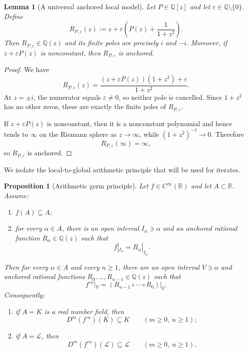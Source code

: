 \documentclass[11pt,reqno]{amsart}
\numberwithin{equation}{section}
\newtheorem{proposition}[theorem]{Proposition}
\newtheorem{lemma}[theorem]{Lemma}
\theoremstyle{definition}
\theoremstyle{remark}
\newcommand{\R}{\mathbb R}
\newcommand{\Q}{\mathbb Q}
\newcommand{\Lio}{\mathscr L}
\begin{document}
\begin{lemma}[A universal anchored local model]\label{lem:model}
Let $P\in\Q[z]$ and let $\varepsilon\in\Q\setminus\{0\}$. Define
\[
R_{P,\varepsilon}(z)
:=z+\varepsilon\left(P(z)+\frac1{1+z^2}\right).
\]
Then $R_{P,\varepsilon}\in\Q(z)$ and its finite poles are precisely $i$ and $-i$.
Moreover, if $z+\varepsilon P(z)$ is nonconstant, then $R_{P,\varepsilon}$ is anchored.
\end{lemma}

\begin{proof}
We have
\[
R_{P,\varepsilon}(z)
=
\frac{(z+\varepsilon P(z))(1+z^2)+\varepsilon}{1+z^2}.
\]
At $z=\pm i$, the numerator equals $\varepsilon\neq0$, so neither pole is
cancelled. Since $1+z^2$ has no other zeros, these are exactly the finite
poles of $R_{P,\varepsilon}$.

If $z+\varepsilon P(z)$ is nonconstant, then it is a nonconstant polynomial
and hence tends to $\infty$ on the Riemann sphere as $z\to\infty$, while
$(1+z^2)^{-1}\to0$. Therefore
\[
R_{P,\varepsilon}(\infty)=\infty,
\]
so $R_{P,\varepsilon}$ is anchored.
\end{proof}

We isolate the local-to-global arithmetic principle that will be used for iterates.

\begin{proposition}[Arithmetic germ principle]\label{prop:germ-principle}
Let $f\in C^\infty(\R)$ and let $A\subset\R$.  Assume:
\begin{enumerate}[label=\textup{(\alph*)}]
\item $f(A)\subseteq A$;
\item for every $\alpha\in A$, there is an open interval $I_\alpha\ni\alpha$ and an anchored rational function $R_\alpha\in\Q(z)$ such that
\[
 f|_{I_\alpha}=R_\alpha|_{I_\alpha}.
\]
\end{enumerate}
Then for every $\alpha\in A$ and every $n\geq1$, there are an open interval $V\ni\alpha$ and anchored rational functions $R_0,\dots,R_{n-1}\in\Q(z)$ such that
\[
 f^{\circ n}|_V=(R_{n-1}\circ\cdots\circ R_0)|_V.
\]
Consequently:
\begin{enumerate}[label=\textup{(\roman*)}]
\item if $A=K$ is a real number field, then
\[
 D^m(f^{\circ n})(K)\subseteq K
\qquad(m\geq0,\ n\geq1);
\]
\item if $A=\Lio$, then
\[
 D^m(f^{\circ n})(\Lio)\subseteq\Lio
\qquad(m\geq0,\ n\geq1).
\]
\end{enumerate}
\end{proposition}
\end{document}
